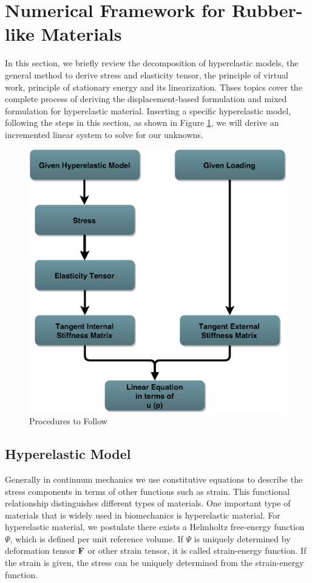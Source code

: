 \section{Numerical Framework for Rubber-like Materials} \label{general}
In this section, we briefly review the decomposition of hyperelastic models, the general method to derive stress and elasticity tensor, the principle of virtual work, principle of stationary energy and its linearization. Thses topics cover the complete process of deriving the displacement-based formulation and mixed formulation for hyperelastic material. Inserting a specific hyperelastic model, following the steps in this section, as shown in Figure \ref{fig:flowchart}, we will derive an incremented linear system to solve for our unknowns. 
\begin{figure}[h!]
\centering
\includegraphics[width=.6\textwidth]{./figures/flowchart.png}
\caption{Procedures to Follow}
\label{fig:flowchart}
\end{figure}

%
\subsection{Hyperelastic Model}
Generally in continuum mechanics we use constitutive equations to describe the stress components in terms of other functions such as strain. This functional relationship distinguishes different types of materials. One important type of materials that is widely used in biomechanics is hyperelastic material. For hyperelastic material, we postulate there exists a Helmholtz free-energy function $\Psi$, which is defined per unit reference volume. If $\Psi$ is uniquely determined by deformation tensor $\bold{F}$ or other strain tensor, it is called strain-energy function. If the strain is given, the stress can be uniquely determined from the strain-energy function.  

